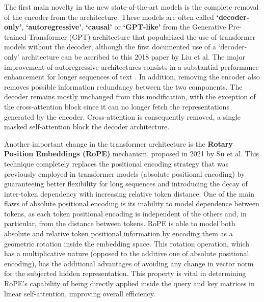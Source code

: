 The first main novelty in the new state-of-the-art models is the complete removal of the encoder from the architecture.
These models are often called \textbf{`decoder-only'}, \textbf{`autoregressive'}, \textbf{`causal'} or \textbf{`GPT-like'} from the Generative Pre-trained Transformer (GPT) architecture  that popularized the use of transformer models without the decoder, although the first documented use of a `decoder-only' architecture can be ascribed to this 2018 paper by Liu et al. 
The major improvement of autoregressive architectures consists in a substantial performance enhancement for longer sequences of text .
In addition, removing the encoder also removes possible information redundancy between the two components.
The decoder remains mostly unchanged from this modification, with the exception of the cross-attention block since it can no longer fetch the representations generated by the encoder.
Cross-attention is consequently removed,  a single masked self-attention block  the decoder architecture.

Another important change in the transformer architecture is the \textbf{Rotary Position Embeddings (RoPE)} mechanism, proposed in 2021 by Su et al. 
This technique completely replaces the positional encoding strategy that was previously employed in transformer models (absolute positional encoding) by guaranteeing better flexibility for long sequences and introducing the decay of inter-token dependency with increasing relative token distance.
One of the main flaws of absolute positional encoding is its inability to model dependence between tokens, as each token positional encoding is independent of the others and, in particular, from the distance between tokens.
RoPE is able to model both absolute and relative token positional information by encoding them as a geometric rotation inside the embedding space.
This rotation operation, which has a multiplicative nature (opposed to the additive one of absolute positional encoding), has the additional advantages of avoiding any change in vector norm for the subjected hidden representation.
This property is vital in determining RoPE's capability of being directly applied inside the query and key matrices in linear self-attention, improving overall efficiency.

